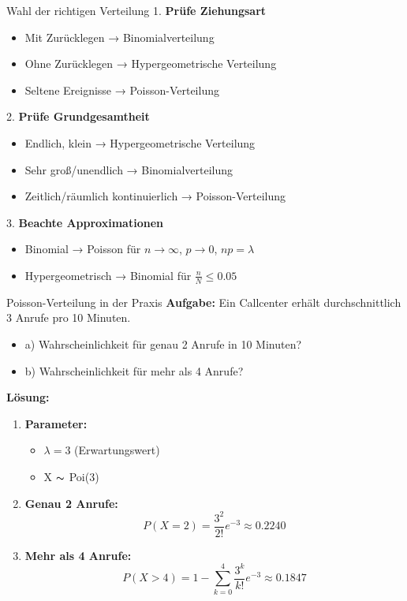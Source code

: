 \begin{KR}{Wahl der richtigen Verteilung}
1. \textbf{Prüfe Ziehungsart}
   \begin{itemize}
   \item Mit Zurücklegen → Binomialverteilung
   \item Ohne Zurücklegen → Hypergeometrische Verteilung
   \item Seltene Ereignisse → Poisson-Verteilung
   \end{itemize}

2. \textbf{Prüfe Grundgesamtheit}
   \begin{itemize}
   \item Endlich, klein → Hypergeometrische Verteilung
   \item Sehr groß/unendlich → Binomialverteilung
   \item Zeitlich/räumlich kontinuierlich → Poisson-Verteilung
   \end{itemize}

3. \textbf{Beachte Approximationen}
   \begin{itemize}
   \item Binomial → Poisson für $n \to \infty$, $p \to 0$, $np = \lambda$
   \item Hypergeometrisch → Binomial für $\frac{n}{N} \leq 0.05$
   \end{itemize}
\end{KR}

\begin{example}{Poisson-Verteilung in der Praxis}
\textbf{Aufgabe:} Ein Callcenter erhält durchschnittlich 3 Anrufe pro 10 Minuten.
\begin{itemize}
\item a) Wahrscheinlichkeit für genau 2 Anrufe in 10 Minuten?
\item b) Wahrscheinlichkeit für mehr als 4 Anrufe?
\end{itemize}

\textbf{Lösung:}
\begin{enumerate}
\item \textbf{Parameter:}
   \begin{itemize}
   \item $\lambda = 3$ (Erwartungswert)
   \item X $\thicksim$ Poi(3)
   \end{itemize}

\item \textbf{Genau 2 Anrufe:}
   $$P(X=2) = \frac{3^2}{2!}e^{-3} \approx 0.2240$$

\item \textbf{Mehr als 4 Anrufe:}
   $$P(X>4) = 1 - \sum_{k=0}^4 \frac{3^k}{k!}e^{-3} \approx 0.1847$$
\end{enumerate}
\end{example}

